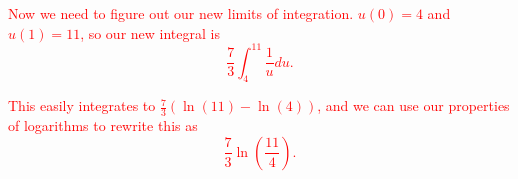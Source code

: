 \documentclass[11pt]{article}
\newcommand{\red}{\textcolor{red}}
\begin{document}
\begin{enumerate}
        \red{Now we need to figure out our new limits of integration. $u(0)=4$ and $u(1)=11$, so our new integral is $$\frac{7}{3}\int_{4}^{11}\frac{1}{u}du.$$}

        \red{This easily integrates to $\frac{7}{3}\left(\ln(11)-\ln(4)\right)$, and we can use our properties of logarithms to rewrite this as $$\frac{7}{3}\ln\left(\frac{11}{4}\right).$$}

        
        
        
    \end{enumerate}
\end{document}
